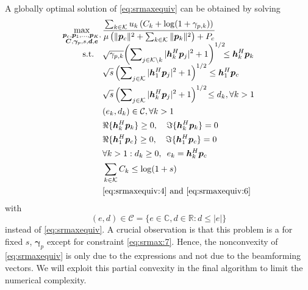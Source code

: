 \documentclass[a4paper,10pt,journal]{IEEEtran}
\let\vec\bm
\begin{document}
A globally optimal solution of \cref{eq:srmaxequiv} can be obtained by solving
\begin{subequations} \label{eq:srmax}
	\begin{align}
		\max_{\substack{\vec p_c, \vec p_1, \dots, \vec p_K,\\ \vec C, \vec \gamma_p, s, \vec d, \vec e}}{} &  \frac{\sum_{k\in\mathcal{K}} u_k \left(C_k+\log(1+ \gamma_{p,k})\right)}{\mu \left( \Vert \vec p_c \Vert^2 + \sum_{k\in\mathcal K} \Vert \vec p_k \Vert^2 \right) + P_c}\\
	\mbox{s.t.}\quad
	& \sqrt{\gamma_{p,k}} \smash{\left( \sum\nolimits_{j\in\mathcal{K}\setminus k}|\vec{h}_{k}^{H}\vec{p}_{j}|^2+1 \right)^{1/2}}\!\!\! \le {\vec{h}}_{k}^{H}\vec{p}_{k}  \label{eq:srmax:1} \\
	& \sqrt s \left( \sum\nolimits_{j\in\mathcal{K}}|\vec{h}_{1}^{H}\vec{p}_{j}|^2+1 \right)^{1/2} \le {\vec{h}}_{1}^{H}\vec{p}_{c}  \label{eq:srmax:2} \\
	& \sqrt s \left( \sum\nolimits_{j\in\mathcal{K}}|\vec{h}_{k}^{H}\vec{p}_{j}|^2+1 \right)^{1/2}\! \le d_k, \forall k > 1 \label{eq:srmax:3} \\
	& (e_k, d_k) \in \mathcal C, \forall k > 1 \label{eq:srmax:8} \\
	& \Re\{\vec h_k^H \vec p_k\} \ge 0,\quad \Im\{\vec h_k^H \vec p_k\} = 0 \label{eq:srmax:4} \\
	& \Re\{\vec h_1^H \vec p_c\} \ge 0,\quad \Im\{\vec h_1^H \vec p_c\} = 0 \label{eq:srmax:5} \\
	& \forall k > 1: d_k \ge 0,\enskip e_k = {\vec{h}}_{k}^{H}\vec{p}_{c}\label{eq:srmax:7} \\
	& \sum_{k\in \mathcal{K}}C_{k}\leq \log(1+ s) \label{eq:srmax:9} \\
	& \eqref{eq:srmaxequiv:4} \text{ and } \eqref{eq:srmaxequiv:6} \label{eq:srmax:10}
	\end{align}
\end{subequations}
with
\begin{equation} \label{eq:circleset}
	(e, d) \in \mathcal C = \{ e\in\mathds C, d \in \mathds R : d  \le | e | \}
\end{equation}
instead of \cref{eq:srmaxequiv}.
A crucial observation is that this problem is a  for fixed $s$, $\vec\gamma_p$ except for constraint \cref{eq:srmax:7}. Hence, the nonconvexity of \cref{eq:srmaxequiv} is only due to the  expressions and not due to the beamforming vectors. We will exploit this partial convexity in the final algorithm to limit the numerical complexity.
\end{document}
